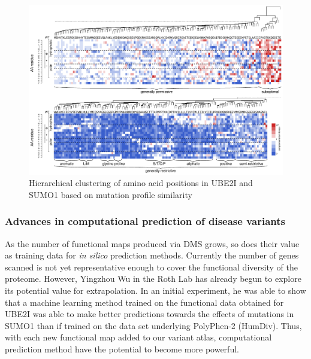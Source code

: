 \begin{figure}[h!]
	\centering
	\includegraphics[width=\textwidth]{img/clustering.pdf}
	\caption{Hierarchical clustering of amino acid positions in UBE2I and SUMO1 based on mutation profile similarity}
	\label{fig:clustering}
\end{figure}

\subsubsection{Advances in computational prediction of disease variants}
As the number of functional maps produced via DMS grows, so does their value as training data for \textit{in silico} prediction methods. Currently the number of genes scanned is not yet representative enough to cover the functional diversity of the proteome. However, Yingzhou Wu in the Roth Lab has already begun to explore its potential value for extrapolation. In an initial experiment, he was able to show that a machine learning method trained on the functional data obtained for UBE2I was able to make better predictions towards the effects of mutations in SUMO1 than if trained on the data set underlying PolyPhen-2 (HumDiv). Thus, with each new functional map added to our variant atlas, computational prediction method have the potential to become more powerful.

